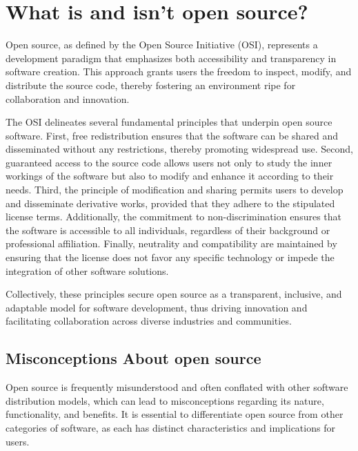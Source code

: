 \section{What is and isn’t open source?}


Open source, as defined by the Open Source Initiative (OSI), represents a development paradigm that emphasizes both accessibility and transparency in software creation. 
This approach grants users the freedom to inspect, modify, and distribute the source code, thereby fostering an environment ripe for collaboration and innovation.

The OSI delineates several fundamental principles that underpin open source software. 
First, free redistribution ensures that the software can be shared and disseminated without any restrictions, thereby promoting widespread use. 
Second, guaranteed access to the source code allows users not only to study the inner workings of the software but also to modify and enhance it according to their needs. 
Third, the principle of modification and sharing permits users to develop and disseminate derivative works, provided that they adhere to the stipulated license terms. 
Additionally, the commitment to non-discrimination ensures that the software is accessible to all individuals, regardless of their background or professional affiliation. 
Finally, neutrality and compatibility are maintained by ensuring that the license does not favor any specific technology or impede the integration of other software solutions.

Collectively, these principles secure open source as a transparent, inclusive, and adaptable model for software development, 
thus driving innovation and facilitating collaboration across diverse industries and communities.

\cite{Open_Source_Initiative_OS_definition}

\subsection{Misconceptions About open source}

Open source is frequently misunderstood and often conflated with other software distribution models, which can lead to misconceptions regarding its nature, 
functionality, and benefits. It is essential to differentiate open source from other categories of software, as each has distinct characteristics and implications for users.

